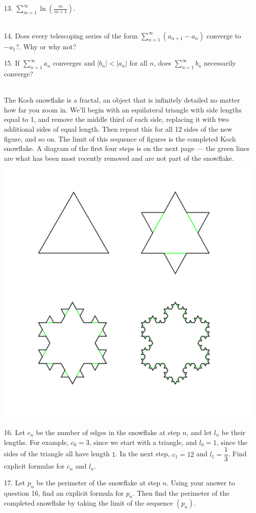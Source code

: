\documentclass{article}
\begin{document}
13. $\displaystyle \sum_{m = 1}^\infty \ln\left( \frac{m}{m + 1} \right)$.

~\\

14. Does every telescoping series of the form $\displaystyle \sum_{n = 1}^\infty (a_{n + 1} - a_n)$ converge to $-a_1$?. Why or why not?

15. If $\displaystyle \sum_{n = 1}^\infty a_n$ converges and $|b_n| < |a_n|$ for all $n$, does $\displaystyle \sum_{n = 1}^\infty b_n$ necessarily converge?

~\\

The Koch snowflake is a fractal, an object that is infinitely detailed no matter how far you zoom in. We'll begin with an equilateral triangle with side lengths equal to 1, and remove the middle third of each side, replacing it with two additional sides of equal length. Then repeat this for all 12 sides of the new figure, and so on. The limit of this sequence of figures is the completed Koch snowflake. A diagram of the first four steps is on the next page --- the green lines are what has been most recently removed and are not part of the snowflake.

\begin{center}
	\includegraphics[width=0.5\linewidth]{koch-snowflake.png}
\end{center}

16. Let $c_n$ be the number of edges in the snowflake at step $n$, and let $l_n$ be their lengths. For example, $c_0 = 3$, since we start with a triangle, and $l_0 = 1$, since the sides of the triangle all have length $1$. In the next step, $c_1 = 12$ and $l_1 = \dfrac{1}{3}$. Find explicit formulas for $c_n$ and $l_n$.

17. Let $p_n$ be the perimeter of the snowflake at step $n$. Using your answer to question 16, find an explicit formula for $p_n$. Then find the perimeter of the completed snowflake by taking the limit of the sequence $(p_n)$.
\end{document}
